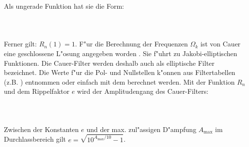 Als ungerade Funktion hat sie die Form:\\~~\\
\\~\\
Ferner gilt: $R_{n}(1)=1$. F"ur die Berechnung der Frequenzen $\Omega_{k}$ ist von Cauer eine
geschlossene L"osung angegeben worden \cite{DAN:74}. Sie f"uhrt zu
Jakobi-elliptischen Funktionen. Die Cauer-Filter werden deshalb auch
als elliptische Filter bezeichnet. Die Werte
f"ur die Pol- und Nullstellen k"onnen aus Filtertabellen (z.B. \cite{ZVE:67}) entnommen oder
einfach mit dem  berechnet werden. Mit
der Funktion $R_{n}$ und dem Rippelfaktor $e$ wird der Amplitudengang
des Cauer-Filters:\\~\\
~\\~\\
Zwischen der Konstanten $e$ und der max. zul"assigen D"ampfung $A_{\max}$ im
Durchlassbereich gilt $e=\sqrt{10^{A_{\max}/10}-1}$.\\
